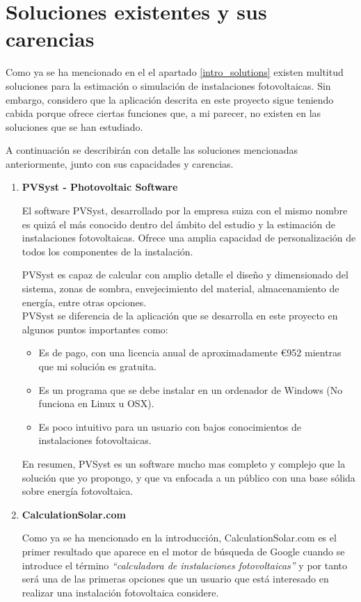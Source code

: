 \section{Soluciones existentes y sus carencias} \label{existing_solutions}

Como ya se ha mencionado en el el apartado \ref{intro_solutions}  existen multitud soluciones para la estimación o simulación de instalaciones fotovoltaicas. Sin embargo, considero que la aplicación descrita en este proyecto sigue teniendo cabida porque ofrece ciertas funciones que, a mi parecer, no existen en las soluciones que se han estudiado.

A continuación se describirán con detalle las soluciones mencionadas anteriormente, junto con sus capacidades y carencias.
\pagebreak

\begin{enumerate}
\item \textbf{PVSyst - Photovoltaic Software}

El software PVSyst, desarrollado por la empresa suiza con el mismo nombre es quizá el más conocido dentro del ámbito del estudio y la estimación de instalaciones fotovoltaicas. Ofrece una amplia capacidad de personalización de todos los componentes de la instalación.

PVSyst es capaz de calcular con amplio detalle el diseño y dimensionado del sistema, zonas de sombra, envejecimiento del material, almacenamiento de energía, entre otras opciones.\\

PVSyst se diferencia de la aplicación que se desarrolla en este proyecto en algunos puntos importantes como:
	\begin{itemize}
		\item Es de pago, con una licencia anual de aproximadamente \euro{952} mientras que mi solución es gratuita.
		\item Es un programa que se debe instalar en un ordenador de Windows (No funciona en Linux u OSX).
		\item Es poco intuitivo para un usuario con bajos conocimientos de instalaciones fotovoltaicas.
	\end{itemize}
En resumen, PVSyst es un software mucho mas completo y complejo que la solución que yo propongo, y que va enfocada a un público con una base sólida sobre energía fotovoltaica.
\item \textbf{CalculationSolar.com}

Como ya se ha mencionado en la introducción, CalculationSolar.com es el primer resultado que aparece en el motor de búsqueda de Google cuando se introduce el término \textit{``calculadora de instalaciones fotovoltaicas''} y por tanto será una de las primeras opciones que un usuario que está interesado en realizar una instalación fotovoltaica considere.


\end{enumerate}
